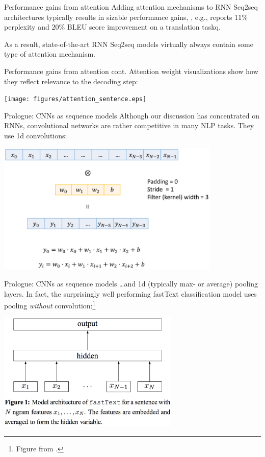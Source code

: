 \documentclass[style=upen, size=14pt]{powerdot}
\newcommand{\gold}{\color{arany}}
\theoremstyle{definition}
\begin{document}
\begin{slide}[toc=]{Performance gains from attention} Adding attention
  mechanisms to RNN Seq2seq architectures typically results in sizable
  performance gains, \citet[63]{luong2016neural}, e.g., reports 11\% perplexity
  and 20\% BLEU score improvement on a translation taskq.\bigskip

  As a result, state-of-the-art RNN Seq2seq models virtually always contain some
  type of attention mechanism.
\end{slide}

\begin{slide}[toc=]{Performance gains from attention cont.}
  Attention weight visualizations show how they reflect relevance to the decoding step:
  \begin{center}
    \texttt{[image: figures/attention\_sentence.eps]}
  \end{center}
\end{slide}


\begin{slide}[toc=CNNs]{Prologue: CNNs as sequence models}
  Although our discussion has concentrated on RNNs, {\gold convolutional
    networks} are rather competitive in many NLP tasks. They use 1d
  convolutions:
  \begin{center}
    \includegraphics[width=0.8\textwidth]{figures/1d_conv.eps}
  \end{center}
\end{slide}

\begin{slide}[toc=]{Prologue: CNNs as sequence models}
  \dots and 1d (typically max- or average) pooling layers. In fact, the surprisingly
  well performing {\gold fastText} classification model uses pooling
  \emph{without} convolution:\footnote{Figure from \cite{joulin2016bag}.}
  \begin{center}
    \includegraphics[width=0.65\textwidth]{figures/fastext.eps}
  \end{center}
\end{slide}
\end{document}
